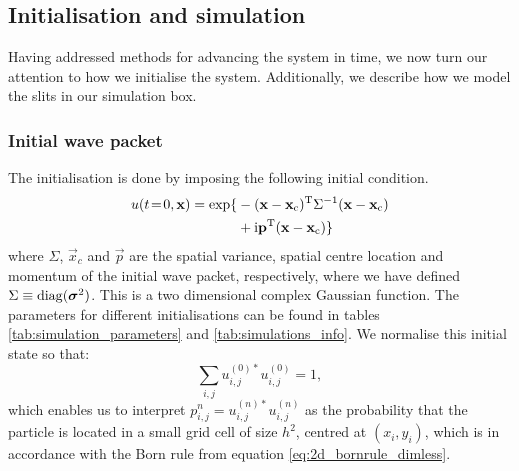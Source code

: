 \subsection{Initialisation and simulation}\label{sec:methods:simulation}
    Having addressed methods for advancing the system in time, we now turn our attention to how we initialise the system. Additionally, we describe how we model the slits in our simulation box.   
    
    \subsubsection{Initial wave packet}\label{sec:methods:simulation:initial_wave}
        The initialisation is done by imposing the following initial condition. 
        \begin{equation}\label{eq:p4_initial_condition}
        \begin{split}
            u(t\!=\!0, \mathbf{x}) = \exp\{ &-(\mathbf{x}-\mathbf{x}_\mathrm{c})^\mathrm{T}\Sigma^{-1}(\mathbf{x}-\mathbf{x}_\mathrm{c}) \\ 
            &+ \mathrm{i} \mathbf{p}^\mathrm{T}(\mathbf{x}-\mathbf{x}_\mathrm{c})\}  
        \end{split}
        \end{equation}
        where $\Sigma$, $\vec{x}_c$ and $\vec{p}$ are the spatial variance, spatial centre location and momentum of the initial wave packet, respectively, where we have defined $\Sigma \equiv \mathrm{diag}(\boldsymbol{\sigma}^2)$. This is a two dimensional complex Gaussian function. The parameters for different initialisations can be found in tables \ref{tab:simulation_parameters} and \ref{tab:simulations_info}. We normalise this initial state so that:
        \begin{equation}
            \sum_{i,j}u_{i,j}^{(0)*}u_{i,j}^{(0)} = 1, 
        \end{equation}
        which enables us to interpret $p_{i,j}^{n} = u_{i,j}^{(n)*}u_{i,j}^{(n)}$ as the probability that the particle is located in a small grid cell of size $h^2$, centred at $(x_i, y_i)$, which is in accordance with the Born rule from equation \eqref{eq:2d_bornrule_dimless}.
    

